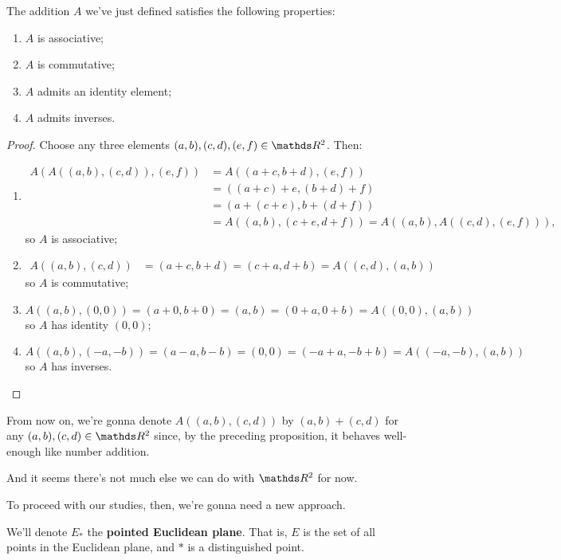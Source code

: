 \begin{prop}
	The addition $A$ we've just defined satisfies the following properties:
	\begin{enumerate}[(i.)]
		\item $A$ is associative;
		\item $A$ is commutative;
		\item $A$ admits an identity element;
		\item $A$ admits inverses.
	\end{enumerate}
\end{prop}
\begin{proof}
	Choose any three elements $(a,b),(c,d),(e,f)\in\R^2$. Then:
	\begin{enumerate}[(i.)]
		\item \begin{align*}
			A\left(A\left((a,b),(c,d)\right),(e,f)\right)&=A((a+c,b+d),(e,f))\\
			&=((a+c)+e,(b+d)+f)\\
			&=(a+(c+e),b+(d+f))\\
			&=A((a,b),(c+e,d+f))=A((a,b),A((c,d),(e,f))),
		\end{align*}so $A$ is associative;
		
		\item \begin{align*}
		A((a,b),(c,d))&=(a+c,b+d)=(c+a,d+b)=A((c,d),(a,b))
		\end{align*}so $A$ is commutative;
		
		\item $A((a,b),(0,0))=(a+0,b+0)=(a,b)=(0+a,0+b)=A((0,0),(a,b))$ so $A$ has identity $(0,0)$;
		
		\item $A((a,b),(-a,-b))=(a-a,b-b)=(0,0)=(-a+a,-b+b)=A((-a,-b),(a,b))$ so $A$ has inverses.
	\end{enumerate}
\end{proof}

\begin{rmk}
	From now on, we're gonna denote $A((a,b),(c,d))$ by $(a,b)+(c,d)$ for any $(a,b),(c,d)\in \R^2$ since, by the preceding proposition, it behaves well-enough like number addition.
\end{rmk}

And it seems there's not much else we can do with $\R^2$ for now.

To proceed with our studies, then, we're gonna need a new approach.

\begin{df}
	We'll denote $E_*$ the \textbf{pointed Euclidean plane}. That is, $E$ is the set of all points in the Euclidean plane, and $*$ is a distinguished point.
\end{df}

